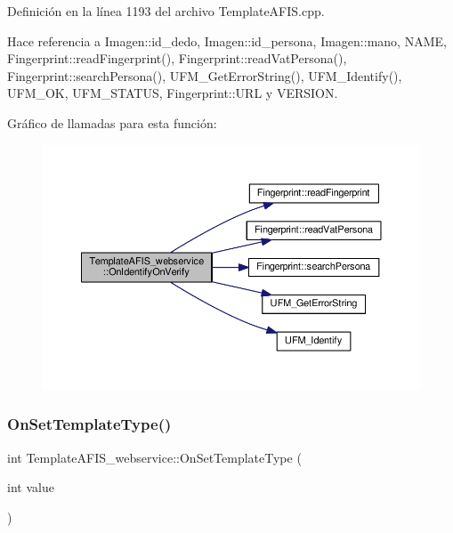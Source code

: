 Definición en la línea 1193 del archivo Template\+A\+F\+I\+S.\+cpp.



Hace referencia a Imagen\+::id\+\_\+dedo, Imagen\+::id\+\_\+persona, Imagen\+::mano, N\+A\+ME, Fingerprint\+::read\+Fingerprint(), Fingerprint\+::read\+Vat\+Persona(), Fingerprint\+::search\+Persona(), U\+F\+M\+\_\+\+Get\+Error\+String(), U\+F\+M\+\_\+\+Identify(), U\+F\+M\+\_\+\+OK, U\+F\+M\+\_\+\+S\+T\+A\+T\+US, Fingerprint\+::\+U\+RL y V\+E\+R\+S\+I\+ON.

Gráfico de llamadas para esta función\+:\nopagebreak
\begin{figure}[H]
\begin{center}
\leavevmode
\includegraphics[width=350pt]{classTemplateAFIS__webservice_a2c62949a4ec904bfc4571d95d577ddb4_cgraph}
\end{center}
\end{figure}
\hypertarget{classTemplateAFIS__webservice_aa89af892ebe892d1a92f1e2dad5e998d}{}\label{classTemplateAFIS__webservice_aa89af892ebe892d1a92f1e2dad5e998d} 
\subsubsection{\texorpdfstring{On\+Set\+Template\+Type()}{OnSetTemplateType()}}
{\footnotesize\ttfamily int Template\+A\+F\+I\+S\+\_\+webservice\+::\+On\+Set\+Template\+Type (\begin{DoxyParamCaption}\item[{int}]{value }\end{DoxyParamCaption})}



